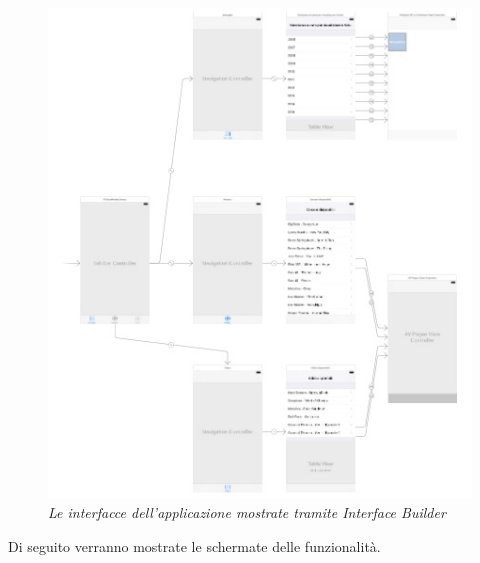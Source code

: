 \begin{figure}[H]
      \centering
      \includegraphics[scale=0.60]{immagini/app_views.jpg}
            \vspace{0.8cm}
            \caption{\textit{Le interfacce dell'applicazione mostrate tramite \textit{Interface Builder}}}
\end{figure}
\newpage
Di seguito verranno mostrate le schermate delle funzionalità.\\

